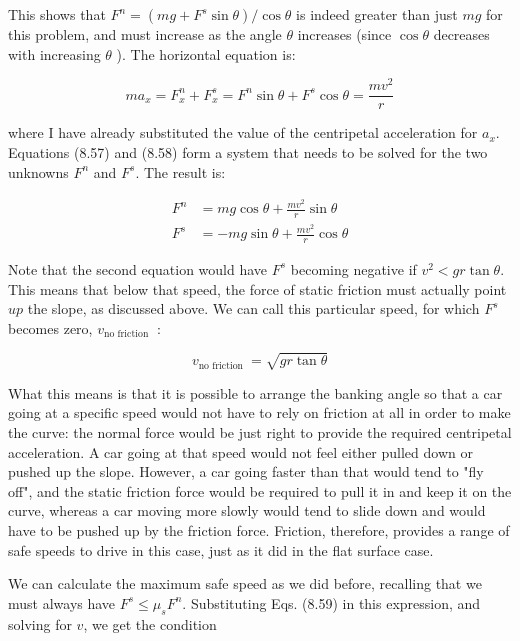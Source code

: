 \documentclass[10pt]{article}
\begin{document}
This shows that $F^{n}=\left(m g+F^{s} \sin \theta\right) / \cos \theta$ is indeed greater than just $m g$ for this problem, and must increase as the angle $\theta$ increases (since $\cos \theta$ decreases with increasing $\theta$ ). The horizontal equation is:


\begin{equation*}
m a_{x}=F_{x}^{n}+F_{x}^{s}=F^{n} \sin \theta+F^{s} \cos \theta=\frac{m v^{2}}{r} \tag{8.58}
\end{equation*}


where I have already substituted the value of the centripetal acceleration for $a_{x}$. Equations (8.57) and (8.58) form a system that needs to be solved for the two unknowns $F^{n}$ and $F^{s}$. The result is:


\begin{align*}
F^{n} & =m g \cos \theta+\frac{m v^{2}}{r} \sin \theta \\
F^{s} & =-m g \sin \theta+\frac{m v^{2}}{r} \cos \theta \tag{8.59}
\end{align*}


Note that the second equation would have $F^{s}$ becoming negative if $v^{2}<g r \tan \theta$. This means that below that speed, the force of static friction must actually point $u p$ the slope, as discussed above. We can call this particular speed, for which $F^{s}$ becomes zero, $v_{\text {no friction }}$ :


\begin{equation*}
v_{\text {no friction }}=\sqrt{g r \tan \theta} \tag{8.60}
\end{equation*}


What this means is that it is possible to arrange the banking angle so that a car going at a specific speed would not have to rely on friction at all in order to make the curve: the normal force would be just right to provide the required centripetal acceleration. A car going at that speed would not feel either pulled down or pushed up the slope. However, a car going faster than that would tend to "fly off", and the static friction force would be required to pull it in and keep it on the curve, whereas a car moving more slowly would tend to slide down and would have to be pushed up by the friction force. Friction, therefore, provides a range of safe speeds to drive in this case, just as it did in the flat surface case.

We can calculate the maximum safe speed as we did before, recalling that we must always have $F^{s} \leq \mu_{s} F^{n}$. Substituting Eqs. (8.59) in this expression, and solving for $v$, we get the condition
\end{document}
